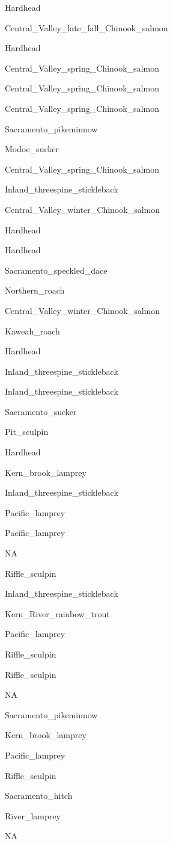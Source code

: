 \documentclass[]{article}
\begin{document}
Hardhead

Central\_Valley\_late\_fall\_Chinook\_salmon

Hardhead

Central\_Valley\_spring\_Chinook\_salmon

Central\_Valley\_spring\_Chinook\_salmon

Central\_Valley\_spring\_Chinook\_salmon

Sacramento\_pikeminnow

Modoc\_sucker

Central\_Valley\_spring\_Chinook\_salmon

Inland\_threespine\_stickleback

Central\_Valley\_winter\_Chinook\_salmon

Hardhead

Hardhead

Sacramento\_speckled\_dace

Northern\_roach

Central\_Valley\_winter\_Chinook\_salmon

Kaweah\_roach

Hardhead

Inland\_threespine\_stickleback

Inland\_threespine\_stickleback

Sacramento\_sucker

Pit\_sculpin

Hardhead

Kern\_brook\_lamprey

Inland\_threespine\_stickleback

Pacific\_lamprey

Pacific\_lamprey

NA

Riffle\_sculpin

Inland\_threespine\_stickleback

Kern\_River\_rainbow\_trout

Pacific\_lamprey

Riffle\_sculpin

Riffle\_sculpin

NA

Sacramento\_pikeminnow

Kern\_brook\_lamprey

Pacific\_lamprey

Riffle\_sculpin

Sacramento\_hitch

River\_lamprey

NA
\end{document}
